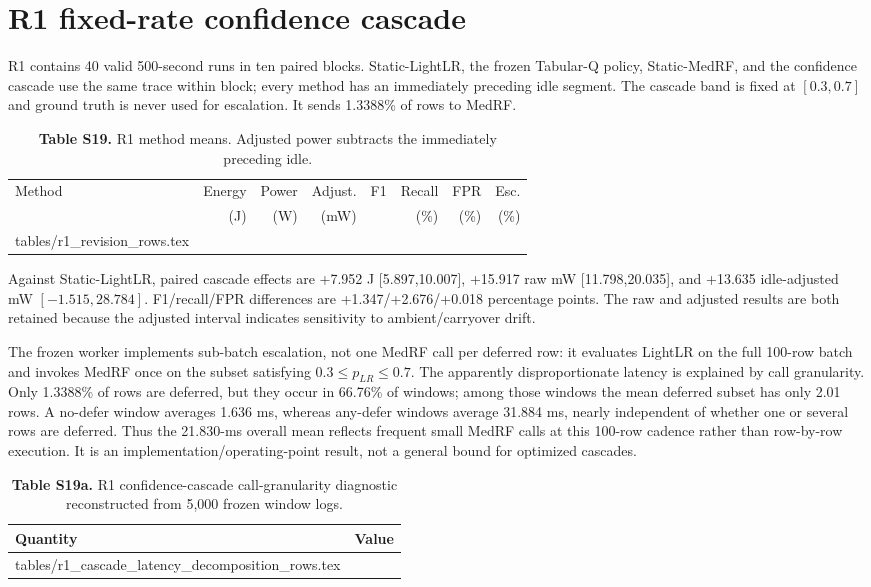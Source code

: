 \documentclass[10pt,a4paper]{article}
\makeatletter
\newcommand{\tableinput}[1]{\@@input #1.tex }
\makeatother
\begin{document}
\clearpage
\section{R1 fixed-rate confidence cascade}
R1 contains 40 valid 500-second runs in ten paired blocks. Static-LightLR, the frozen Tabular-Q policy, Static-MedRF, and the confidence cascade use the same trace within block; every method has an immediately preceding idle segment. The cascade band is fixed at $[0.3,0.7]$ and ground truth is never used for escalation. It sends 1.3388\% of rows to MedRF.

\begin{table}[h!]
\centering\footnotesize
\caption*{\textbf{Table S19.} R1 method means. Adjusted power subtracts the immediately preceding idle.}
\setlength{\tabcolsep}{3.0pt}
\begin{tabular}{lrrrrrrr}\toprule
Method & Energy & Power & Adjust. & F1 & Recall & FPR & Esc.\\
 & (J) & (W) & (mW) & & (\%) & (\%) & (\%)\\\midrule
\tableinput{tables/r1_revision_rows}
\bottomrule\end{tabular}
\end{table}

Against Static-LightLR, paired cascade effects are +7.952 J [5.897,10.007], +15.917 raw mW [11.798,20.035], and +13.635 idle-adjusted mW $[-1.515,28.784]$. F1/recall/FPR differences are +1.347/+2.676/+0.018 percentage points. The raw and adjusted results are both retained because the adjusted interval indicates sensitivity to ambient/carryover drift.

The frozen worker implements sub-batch escalation, not one MedRF call per deferred row: it evaluates LightLR on the full 100-row batch and invokes MedRF once on the subset satisfying $0.3\le p_{LR}\le0.7$. The apparently disproportionate latency is explained by call granularity. Only 1.3388\% of rows are deferred, but they occur in 66.76\% of windows; among those windows the mean deferred subset has only 2.01 rows. A no-defer window averages 1.636 ms, whereas any-defer windows average 31.884 ms, nearly independent of whether one or several rows are deferred. Thus the 21.830-ms overall mean reflects frequent small MedRF calls at this 100-row cadence rather than row-by-row execution. It is an implementation/operating-point result, not a general bound for optimized cascades.

\begin{table}[h!]
\centering\footnotesize
\caption*{\textbf{Table S19a.} R1 confidence-cascade call-granularity diagnostic reconstructed from 5,000 frozen window logs.}
\begin{tabular}{lr}\toprule
Quantity & Value\\\midrule
\tableinput{tables/r1_cascade_latency_decomposition_rows}
\bottomrule\end{tabular}
\end{table}
\end{document}
